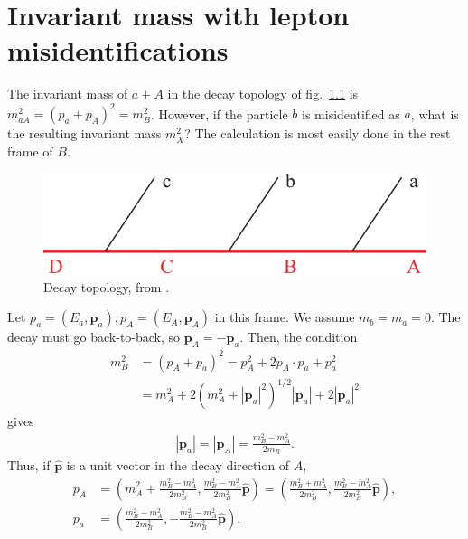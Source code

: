 \documentclass[twoside,english]{uiofysmaster}
\begin{document}

\chapter{Invariant mass with lepton misidentifications}
\label{sec:appendix_invmass-calculations}
The invariant mass of $a + A$ in the decay topology of fig.\ \ref{fig:decaytree_appendix} is $m_{aA}^2 = (p_a + p_A)^2 = m_B^2$. However, if the particle $b$ is misidentified as $a$, what is the resulting invariant mass $m_X^2$? The calculation is most easily done in the rest frame of $B$. 
\begin{figure}[hbt]
\centering
\includegraphics[scale=0.7]{figures/fig-chain.pdf} %
\caption{Decay topology, from \cite{Miller:2005zp}.}
\label{fig:decaytree_appendix}
\end{figure}Let $p_a = (E_a, \mathbf p_a), p_A = (E_A, \mathbf p_A)$ in this frame. We assume $m_b = m_a = 0$. The decay must go back-to-back, so $\mathbf p_A = -\mathbf p_a$. Then, the condition
\begin{align}
	m_B^2 &= (p_A + p_a)^2 = p_A^2 + 2p_A \cdot p_a + p_a^2\\
	 		&= m_A^2 + 2\left( m_A^2 + |\mathbf p_a|^2 \right)^{1/2} |\mathbf p_a| + 2|\mathbf p_a|^2 
\end{align}
gives
\begin{align}
	|\mathbf{p}_a| = |\mathbf{p}_A| = \frac{m_B^2 - m_A^2}{2m_B}.
\end{align}
Thus, if $\hat{\mathbf{p}}$ is a unit vector in the decay direction of $A$,
\begin{align}
	p_A &= \left( m_A^2 + \frac{m_B^2-m_A^2}{2m_B^2},  \frac{m_B^2-m_A^2}{2m_B^2}\hat{\mathbf{p}} \right) = \left( \frac{m_B^2+m_A^2}{2m_B^2},  \frac{m_B^2-m_A^2}{2m_B^2} \hat{\mathbf{p}} \right),\\
	p_a &= \left( \frac{m_B^2-m_A^2}{2m_B^2},  -\frac{m_B^2-m_A^2}{2m_B^2}\hat{\mathbf{p}} \right). \nonumber
\end{align}
\end{document}
